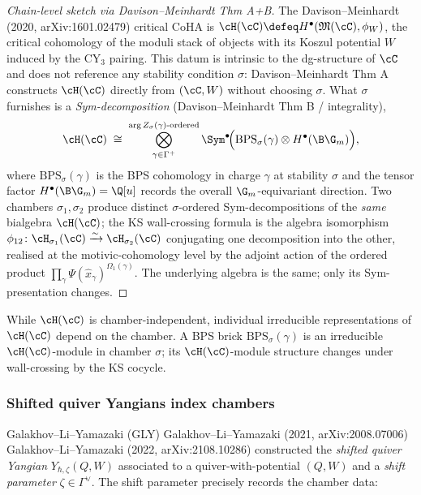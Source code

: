 \begin{proof}[Chain-level sketch via Davison--Meinhardt Thm A+B]
 The Davison--Meinhardt (2020, arXiv:1601.02479) critical CoHA is
 $\cH(\cC) \defeq H^\bullet(\mathfrak{M}(\cC), \phi_W)$,
 the critical cohomology of the moduli stack of objects with its
 Koszul potential $W$ induced by the CY$_3$ pairing. This datum is
 intrinsic to the dg-structure of $\cC$ and does not reference any
 stability condition $\sigma$: Davison--Meinhardt Thm A constructs
 $\cH(\cC)$ directly from $(\cC, W)$ without choosing $\sigma$. What
 $\sigma$ furnishes is a \emph{Sym-decomposition} (Davison--Meinhardt
 Thm B / integrality),
 \[
 \cH(\cC) \;\cong\; \bigotimes_{\gamma \in \Gamma^+}^{\arg Z_\sigma(\gamma)\text{-ordered}}
 \Sym^\bullet\!\Big(\mathrm{BPS}_\sigma(\gamma) \otimes H^\bullet(\B \G_m)\Big),
 \]
 where $\mathrm{BPS}_\sigma(\gamma)$ is the BPS cohomology in charge
 $\gamma$ at stability $\sigma$ and the tensor factor $H^\bullet(\B \G_m) =
 \Q[u]$ records the overall $\G_m$-equivariant direction. Two chambers
 $\sigma_1, \sigma_2$ produce distinct $\sigma$-ordered Sym-decompositions
 of the \emph{same} bialgebra $\cH(\cC)$; the KS wall-crossing formula is
 the algebra isomorphism $\phi_{12} \colon \cH_{\sigma_1}(\cC)
 \xrightarrow{\sim} \cH_{\sigma_2}(\cC)$ conjugating one decomposition
 into the other, realised at the motivic-cohomology level by the adjoint
 action of the ordered product $\prod_\gamma \Psi(\hat{x}_\gamma)^{\Omega_1(\gamma)}$.
 The underlying algebra is the same; only its Sym-presentation changes.
\end{proof}

\begin{corollary}
 \label{cor:reps-chamber-parametrised}
 While $\cH(\cC)$ is chamber-independent, individual irreducible
 representations of $\cH(\cC)$ depend on the chamber. A BPS brick
 $\mathrm{BPS}_\sigma(\gamma)$ is an irreducible $\cH(\cC)$-module in
 chamber $\sigma$; its $\cH(\cC)$-module structure changes under
 wall-crossing by the KS cocycle.
\end{corollary}

\subsubsection{Shifted quiver Yangians index chambers}

Galakhov--Li--Yamazaki (GLY) Galakhov--Li--Yamazaki (2021, arXiv:2008.07006)
Galakhov--Li--Yamazaki (2022, arXiv:2108.10286) constructed the \emph{shifted quiver Yangian}
$Y_{\hbar, \zeta}(Q, W)$ associated to a quiver-with-potential $(Q, W)$ and
a \emph{shift parameter} $\zeta \in \Gamma^\vee$. The shift parameter
precisely records the chamber data:

